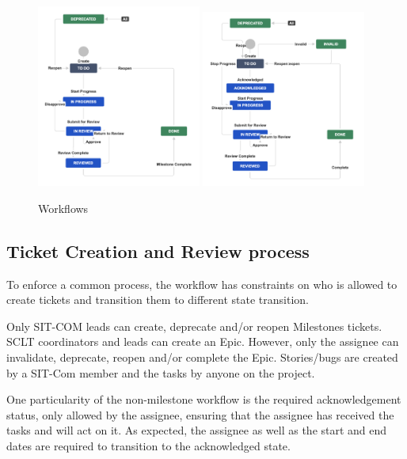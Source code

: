 \documentclass[SE,authoryear,toc]{lsstdoc}
\begin{document}
\begin{figure}[h]
\begin{center}
\includegraphics[width=0.48\textwidth]{WorkFlowMilestones.png}
\includegraphics[width=0.48\textwidth]{WorkFlowNonMilestones.png}
\caption{\label{fig:workflow} Workflows}
\end{center}
\end{figure}


\subsection{Ticket Creation and Review process}
To enforce a common process, the workflow has constraints on who is allowed to create tickets and transition them to different state transition. 

Only SIT-COM leads can create, deprecate and/or reopen Milestones tickets. 
SCLT coordinators and leads can create an Epic. 
However, only the assignee can invalidate, deprecate, reopen and/or complete the Epic. 
Stories/bugs are created by a SIT-Com member and the tasks by anyone on the project. 

One particularity of the non-milestone workflow is the required acknowledgement status, only allowed by the assignee, ensuring that the assignee has received the tasks and will act on it. 
As expected, the assignee as well as the start and end dates are required to transition to the acknowledged state.
\end{document}
